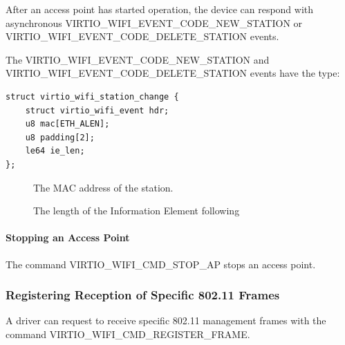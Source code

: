After an access point has started operation, the device can respond with asynchronous VIRTIO_WIFI_EVENT_CODE_NEW_STATION or VIRTIO_WIFI_EVENT_CODE_DELETE_STATION events.

The VIRTIO_WIFI_EVENT_CODE_NEW_STATION and VIRTIO_WIFI_EVENT_CODE_DELETE_STATION events have the type:

\begin{lstlisting}
struct virtio_wifi_station_change {
	struct virtio_wifi_event hdr;
	u8 mac[ETH_ALEN];
	u8 padding[2];
	le64 ie_len;
};
\end{lstlisting}

\begin{description}
\item[] The MAC address of the station.
\item[] The length of the Information Element following  %
\end{description}

\paragraph{Stopping an Access Point}\label{sec:Device Types / 802.11 Device / Device Operation / Access Point Management / Stopping an Access Point}

The command VIRTIO_WIFI_CMD_STOP_AP stops an access point.


\subsubsection{Registering Reception of Specific 802.11 Frames}\label{sec:Device Types / 802.11 Device / Device Operation / Registering Reception of Specific 802.11 Frames}

A driver can request to receive specific 802.11 management frames with the command VIRTIO_WIFI_CMD_REGISTER_FRAME.

